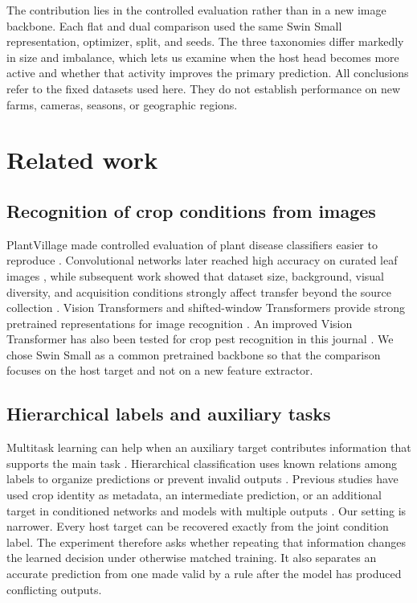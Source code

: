 \documentclass[preprint,12pt]{elsarticle}
\begin{document}
The contribution lies in the controlled evaluation rather than in a new image
backbone. Each flat and dual comparison used the same Swin Small representation,
optimizer, split, and seeds. The three taxonomies differ markedly in size and
imbalance, which lets us examine when the host head becomes more active and
whether that activity improves the primary prediction. All conclusions refer
to the fixed datasets used here. They do not establish performance on new
farms, cameras, seasons, or geographic regions.

\section{Related work}
\label{sec:related}

\subsection{Recognition of crop conditions from images}

PlantVillage made controlled evaluation of plant disease classifiers easier to
reproduce \cite{hughes2015,mohanty2016}. Convolutional networks later reached
high accuracy on curated leaf images \cite{ferentinos2018}, while subsequent
work showed that dataset size, background, visual diversity, and acquisition
conditions strongly affect transfer beyond the source collection
\cite{barbedo2018,gui2021}. Vision Transformers and shifted-window
Transformers provide strong pretrained representations for image recognition
\cite{dosovitskiy2021,liu2021swin}. An improved Vision Transformer has also
been tested for crop pest recognition in this journal \cite{fu2024}. We chose
Swin Small as a common pretrained backbone so that the comparison focuses on
the host target and not on a new feature extractor.

\subsection{Hierarchical labels and auxiliary tasks}

Multitask learning can help when an auxiliary target contributes information
that supports the main task \cite{caruana1997}. Hierarchical classification
uses known relations among labels to organize predictions or prevent invalid
outputs \cite{silla2011}. Previous studies have used crop identity as metadata,
an intermediate prediction, or an additional target in conditioned networks
and models with multiple outputs \cite{picon2019,yao2024}. Our setting is
narrower. Every host target can be recovered exactly from the joint condition
label. The experiment therefore asks whether repeating that information changes
the learned decision under otherwise matched training. It also separates an
accurate prediction from one made valid by a rule after the model has produced
conflicting outputs.
\end{document}
